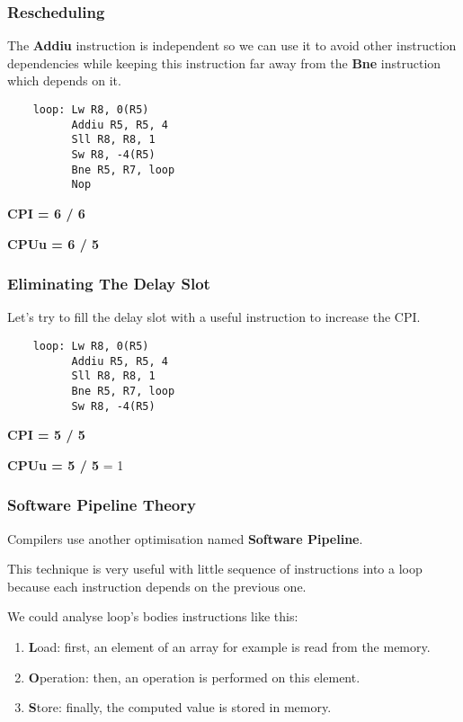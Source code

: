 
\begin{frame}[containsverbatim]
  \frametitle{Rescheduling}

  The \textbf{Addiu} instruction is independent so we can use it to
  avoid other instruction dependencies while keeping this instruction
  far away from the \textbf{Bne} instruction which depends on it.

  \begin{verbatim}
    loop: Lw R8, 0(R5)
          Addiu R5, R5, 4
          Sll R8, R8, 1
          Sw R8, -4(R5)
          Bne R5, R7, loop
          Nop
  \end{verbatim}

  \textbf{CPI = 6 / 6}

  \textbf{CPUu = 6 / 5}
\end{frame}


\begin{frame}[containsverbatim]
  \frametitle{Eliminating The Delay Slot}

  Let's try to fill the delay slot with a useful instruction to
  increase the CPI.

  \begin{verbatim}
    loop: Lw R8, 0(R5)
          Addiu R5, R5, 4
          Sll R8, R8, 1
          Bne R5, R7, loop
          Sw R8, -4(R5)
  \end{verbatim}

  \textbf{CPI = 5 / 5}

  \textbf{CPUu = 5 / 5} \alert{= 1}
\end{frame}


\begin{frame}
  \frametitle{Software Pipeline Theory}

  Compilers use another optimisation named \textbf{Software Pipeline}.

  \nl

  This technique is very useful with little sequence of instructions into
  a loop because each instruction depends on the previous one.

  \nl

  We could analyse loop's bodies instructions like this:

  \begin{enumerate}[<+->]
    \item
      \textbf{L}oad: first, an element of an array for example is read from
      the memory.
    \item
      \textbf{O}peration: then, an operation is performed on this element.
    \item
      \textbf{S}tore: finally, the computed value is stored in memory.
  \end{enumerate}
\end{frame}

